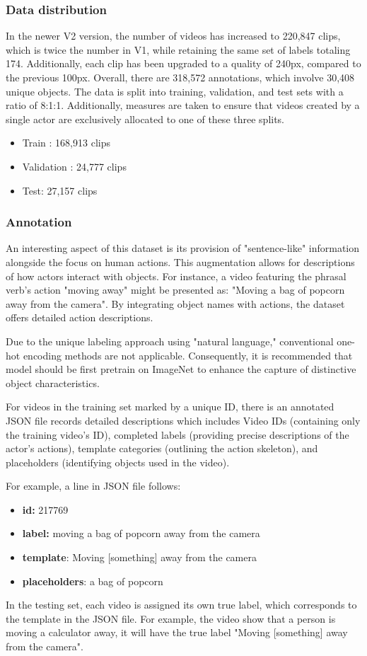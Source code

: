 \documentclass[10pt,onecolumn,letterpaper]{article}
\begin{document}
\subsubsection{Data distribution}
In the newer V2 version, the number of videos has increased to 220,847 clips, which is twice the number in V1, while retaining the same set of labels totaling 174. Additionally, each clip has been upgraded to a quality of 240px, compared to the previous 100px. Overall, there are 318,572 annotations, which involve 30,408 unique objects. The data is split into training, validation, and test sets with a ratio of 8:1:1. Additionally, measures are taken to ensure that videos created by a single actor are exclusively allocated to one of these three splits. 
\begin{itemize}
	\item Train : 168,913 clips
	\item Validation : 24,777 clips
	\item Test: 27,157 clips
\end{itemize}
\subsubsection{Annotation}

An interesting aspect of this dataset is its provision of "sentence-like" information alongside the focus on human actions. This augmentation allows for descriptions of how actors interact with objects. For instance, a video featuring the phrasal verb's action "moving away" might be presented as: "Moving a bag of popcorn away from the camera". By integrating object names with actions, the dataset offers detailed action descriptions. 

Due to the unique labeling approach using "natural language," conventional one-hot encoding methods are not applicable. Consequently, it is recommended that model should be first pretrain on ImageNet to enhance the capture of distinctive object characteristics.

For videos in the training set marked by a unique ID, there is an annotated JSON file records detailed descriptions which includes Video IDs (containing only the training video's ID), completed labels (providing precise descriptions of the actor's actions), template categories (outlining the action skeleton), and placeholders (identifying objects used in the video).

For example, a line in JSON file follows:
\begin{itemize}
\item \textbf{id:} 217769
\item \textbf{label:} moving a bag of popcorn away from the camera
\item \textbf{template}: Moving [something] away from the camera
\item \textbf{placeholders}: a bag of popcorn
\end{itemize}
In the testing set, each video is assigned its own true label, which corresponds to the template in the JSON file. For example, the video show that a person is moving a calculator away, it will have the true label "Moving [something] away from the camera".
\end{document}

